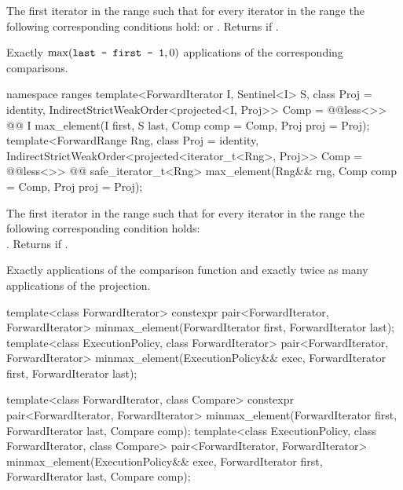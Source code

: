 \begin{itemdescr}
\pnum
\returns
The first iterator
in the range
such that for every iterator
in the range
the following corresponding conditions hold:
or
.
Returns
if
.

\pnum
\complexity
Exactly
$\max(\texttt{last - first - 1}, 0)$
applications of the corresponding comparisons.
\end{itemdescr}

\begin{addedblock}
%
\begin{itemdecl}
namespace ranges {
  template<ForwardIterator I, Sentinel<I> S, class Proj = identity,
      IndirectStrictWeakOrder<projected<I, Proj>> Comp = @@less<>>
    @@ I max_element(I first, S last, Comp comp = Comp{}, Proj proj = Proj{});
  template<ForwardRange Rng, class Proj = identity,
      IndirectStrictWeakOrder<projected<iterator_t<Rng>, Proj>> Comp = @@less<>>
    @@ safe_iterator_t<Rng>
      max_element(Rng&& rng, Comp comp = Comp{}, Proj proj = Proj{});
}
\end{itemdecl}

\begin{itemdescr}
\pnum
\returns
The first iterator
in the range
such that for every iterator
in the range
the following corresponding condition holds: \\
.
Returns
if
.

\pnum
\complexity
Exactly
applications of the comparison function and
exactly twice as many applications of the projection.
\end{itemdescr}
\end{addedblock}

%
\begin{itemdecl}
template<class ForwardIterator>
  constexpr pair<ForwardIterator, ForwardIterator>
    minmax_element(ForwardIterator first, ForwardIterator last);
template<class ExecutionPolicy, class ForwardIterator>
  pair<ForwardIterator, ForwardIterator>
    minmax_element(ExecutionPolicy&& exec,
                   ForwardIterator first, ForwardIterator last);

template<class ForwardIterator, class Compare>
  constexpr pair<ForwardIterator, ForwardIterator>
    minmax_element(ForwardIterator first, ForwardIterator last, Compare comp);
template<class ExecutionPolicy, class ForwardIterator, class Compare>
  pair<ForwardIterator, ForwardIterator>
    minmax_element(ExecutionPolicy&& exec,
                   ForwardIterator first, ForwardIterator last, Compare comp);
\end{itemdecl}

